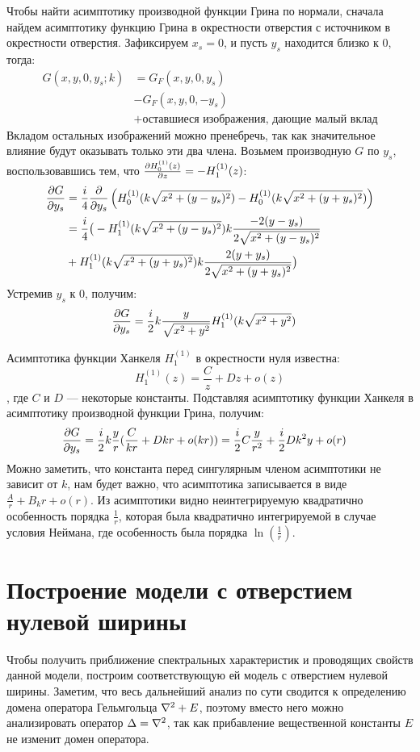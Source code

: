 Чтобы найти асимптотику производной функции Грина по нормали, сначала найдем асимптотику функцию Грина в окрестности отверстия с источником в окрестности отверстия. Зафиксируем $x_s = 0$, и пусть $y_s$ находится близко к $0$, тогда:
\begin{align*}
G(x, y, 0, y_s; k)
&= G_F(x, y, 0, y_s) \\
&- G_F(x, y, 0, -y_s) \\
&+ \text{оставшиеся изображения, дающие малый вклад}
\end{align*}
Вкладом остальных изображений можно пренебречь, так как значительное влияние будут оказывать только эти два члена. Возьмем производную $G$ по $y_s$, воспользовавшись тем, что $\pdv{H_{0}^{(1)}(z)}{z} = - H_{1}^{(1)}(z)$:
\begin{align*}
\pdv{G}{y_s}
&= \frac{i}{4} \pdv{}{y_s} \left( H_{0}^{(1)}(k \sqrt{x^2 + (y - y_s)^2}) - H_{0}^{(1)}(k \sqrt{x^2 + (y + y_s)^2}) \right) \\
&= \frac{i}{4} \big( -H_{1}^{(1)}(k \sqrt{x^2 + (y - y_s)^2}) k \frac{-2 (y - y_s)}{2 \sqrt{x^2 + (y - y_s)^2}} \\
&+ H_{1}^{(1)}(k \sqrt{x^2 + (y + y_s)^2}) k \frac{2 (y + y_s)}{2 \sqrt{x^2 + (y + y_s)^2}} \big)
\end{align*}
Устремив $y_s$ к 0, получим:
\begin{align*}
\pdv{G}{y_s} (x, y, 0, 0; k)
&= \frac{i}{2} k \frac{y}{\sqrt{x^2 + y^2}} H_{1}^{(1)}(k \sqrt{x^2 + y^2})
\end{align*}

Асимптотика функции Ханкеля $H_1^{(1)}$ в окрестности нуля известна:
\[
H_1^{(1)}(z) = \frac{C}{z} + D z + o(z)
\]
, где $C$ и $D$ — некоторые константы. Подставляя асимптотику функции Ханкеля в асимптотику производной функции Грина, получим:
\begin{align*}
\pdv{G}{y_s} (x, y, 0, 0; k)
&= \frac{i}{2} k \frac{y}{r} (\frac{C}{k r} + D k r + o(kr)) = \frac{i}{2} C \frac{y}{r^2} + \frac{i}{2} D k^2 y + o(r)
\end{align*} 
Можно заметить, что константа перед сингулярным членом асимптотики не зависит от $k$, нам будет важно, что асимптотика записывается в виде $\frac{A}{r} + B_k r + o(r)$. Из асимптотики видно неинтегрируемую квадратично особенность порядка $\frac{1}{r}$, которая была квадратично интегрируемой в случае условия Неймана, где особенность была порядка $\ln(\frac{1}{r})$.

\section{Построение модели с отверстием нулевой ширины}
Чтобы получить приближение спектральных характеристик и проводящих свойств данной модели, построим соответствующую ей модель с отверстием нулевой ширины. Заметим, что весь дальнейший анализ по сути сводится к определению домена оператора Гельмгольца $\laplacian + E$, поэтому вместо него можно анализировать оператор $\Delta = \laplacian$, так как прибавление вещественной константы $E$ не изменит домен оператора.

